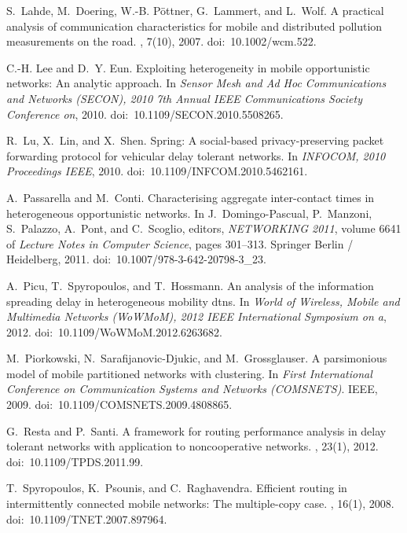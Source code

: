 \documentclass{article}
\begin{document}
\begin{thebibliography}{10}
S.~Lahde, M.~Doering, W.-B. P{\"o}ttner, G.~Lammert, and L.~Wolf.
\newblock A practical analysis of communication characteristics for mobile and
  distributed pollution measurements on the road.
, 7(10), 2007.
\newblock doi:~10.1002/wcm.522.

C.-H. Lee and D.~Y. Eun.
\newblock Exploiting heterogeneity in mobile opportunistic networks: An
  analytic approach.
\newblock In {\em Sensor Mesh and Ad Hoc Communications and Networks (SECON),
  2010 7th Annual IEEE Communications Society Conference on}, 2010.
\newblock doi:~10.1109/SECON.2010.5508265.

R.~Lu, X.~Lin, and X.~Shen.
\newblock Spring: A social-based privacy-preserving packet forwarding protocol
  for vehicular delay tolerant networks.
\newblock In {\em INFOCOM, 2010 Proceedings IEEE}, 2010.
\newblock doi:~10.1109/INFCOM.2010.5462161.

A.~Passarella and M.~Conti.
\newblock Characterising aggregate inter-contact times in heterogeneous
  opportunistic networks.
\newblock In J.~Domingo-Pascual, P.~Manzoni, S.~Palazzo, A.~Pont, and
  C.~Scoglio, editors, {\em NETWORKING 2011}, volume 6641 of {\em Lecture Notes
  in Computer Science}, pages 301--313. Springer Berlin / Heidelberg, 2011.
\newblock doi:~10.1007/978-3-642-20798-3\_23.

A.~Picu, T.~Spyropoulos, and T.~Hossmann.
\newblock An analysis of the information spreading delay in heterogeneous
  mobility dtns.
\newblock In {\em World of Wireless, Mobile and Multimedia Networks (WoWMoM),
  2012 IEEE International Symposium on a}, 2012.
\newblock doi:~10.1109/WoWMoM.2012.6263682.

M.~Piorkowski, N.~Sarafijanovic-Djukic, and M.~Grossglauser.
\newblock A parsimonious model of mobile partitioned networks with clustering.
\newblock In {\em First International Conference on Communication Systems and
  Networks (COMSNETS)}. IEEE, 2009.
\newblock doi:~10.1109/COMSNETS.2009.4808865.

G.~Resta and P.~Santi.
\newblock A framework for routing performance analysis in delay tolerant
  networks with application to noncooperative networks.
, 23(1),
  2012.
\newblock doi:~10.1109/TPDS.2011.99.

T.~Spyropoulos, K.~Psounis, and C.~Raghavendra.
\newblock Efficient routing in intermittently connected mobile networks: The
  multiple-copy case.
, 16(1), 2008.
\newblock doi:~10.1109/TNET.2007.897964.


\end{thebibliography}
\end{document}
